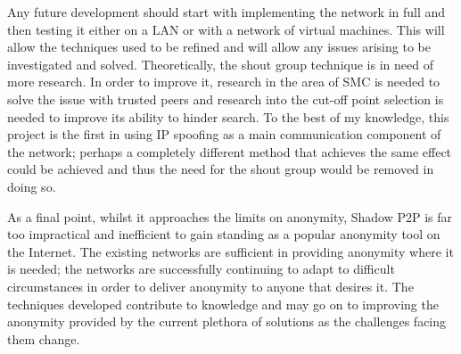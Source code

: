 \documentclass[ %
                    author={Luke Murray},
                supervisor={Dr. Simon Hollis},
                     title={Shadow Peer-to-Peer Networks},
                  subtitle={},
                    degree={MEng},
                      year={2013} ]{thesis}
\begin{document}
Any future development should start with implementing the network in full and then testing it either on a LAN or with a network of virtual machines. This will allow the techniques used to be refined and will allow any issues arising to be investigated and solved. Theoretically, the shout group technique is in need of more research. In order to improve it, research in the area of SMC is needed to solve the issue with trusted peers and research into the cut-off point selection is needed to improve its ability to hinder search. To the best of my knowledge, this project is the first in using IP spoofing as a main communication component of the network; perhaps a completely different method that achieves the same effect could be achieved and thus the need for the shout group would be removed in doing so.

As a final point, whilst it approaches the limits on anonymity, Shadow P2P is far too impractical and inefficient to gain standing as a popular anonymity tool on the Internet. The existing networks are sufficient in providing anonymity where it is needed; the networks are successfully continuing to adapt to difficult circumstances in order to deliver anonymity to anyone that desires it. The techniques developed contribute to knowledge and may go on to improving the anonymity provided by the current plethora of solutions as the challenges facing them change.


%
%

\backmatter




\end{document}
